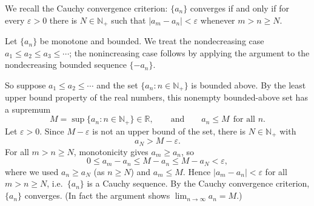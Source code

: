 \documentclass[11pt,a4paper]{article}
\newenvironment{solution}[1]{%
  \par\addvspace{1.7ex}%
  \noindent{\color{solutioncolor}\textbf{#1}}\hspace{0.55em}\ignorespaces}%
  {\par\addvspace{0.9ex}}
\begin{document}
\begin{solution}{Solution 2.3.17}\label{xs:2.3.17}
We recall the Cauchy convergence criterion: $\{a_n\}$ converges if and only if for every $\varepsilon > 0$ there is $N \in \mathbb{N}_+$ such that $|a_m - a_n| < \varepsilon$ whenever $m > n \ge N$.

Let $\{a_n\}$ be monotone and bounded. We treat the nondecreasing case $a_1 \le a_2 \le a_3 \le \cdots$; the nonincreasing case follows by applying the argument to the nondecreasing bounded sequence $\{-a_n\}$.

So suppose $a_1 \le a_2 \le \cdots$ and the set $\{a_n : n \in \mathbb{N}_+\}$ is bounded above. By the least upper bound property of the real numbers, this nonempty bounded-above set has a supremum
\[
M = \sup\{a_n : n \in \mathbb{N}_+\} \in \mathbb{R},
\qquad\text{and}\qquad a_n \le M \ \ \text{for all } n .
\]
Let $\varepsilon > 0$. Since $M - \varepsilon$ is not an upper bound of the set, there is $N \in \mathbb{N}_+$ with
\[
a_N > M - \varepsilon .
\]
For all $m > n \ge N$, monotonicity gives $a_m \ge a_n$, so
\[
0 \le a_m - a_n \le M - a_n \le M - a_N < \varepsilon ,
\]
where we used $a_n \ge a_N$ (as $n \ge N$) and $a_m \le M$. Hence $|a_m - a_n| < \varepsilon$ for all $m > n \ge N$, i.e.\ $\{a_n\}$ is a Cauchy sequence. By the Cauchy convergence criterion, $\{a_n\}$ converges. (In fact the argument shows $\lim_{n\to\infty} a_n = M$.)
\end{solution}
\end{document}

